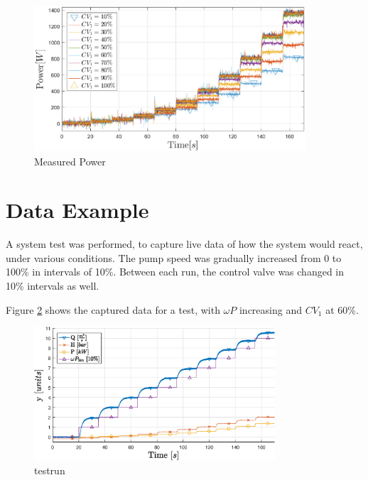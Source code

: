 \begin{figure}[H]
	\centering
	\includegraphics[width=0.9\textwidth]{figures/05mathematicalModelling/measuredPower.eps}
	\caption{Measured Power}
	\label{fig:measuredPower}
\end{figure}


\section{Data Example}\label{sec:results}
A system test was performed, 
to capture live data of how the system would react, 
under various conditions.
The pump speed was gradually increased from 0 to 100\% in intervals of 10\%. 
Between each run, the control valve was changed in 10\% intervals as well.

Figure \ref{fig:testrun} shows the captured data for a test, with $\omega P$ increasing and $CV_1$ at 60\%.

\begin{figure}[H]
	\centering
	\includegraphics[width=0.8\textwidth]{figures/04ExperimentsAndLabWork/testrun.eps}
	\caption{testrun}
	\label{fig:testrun}
\end{figure}

